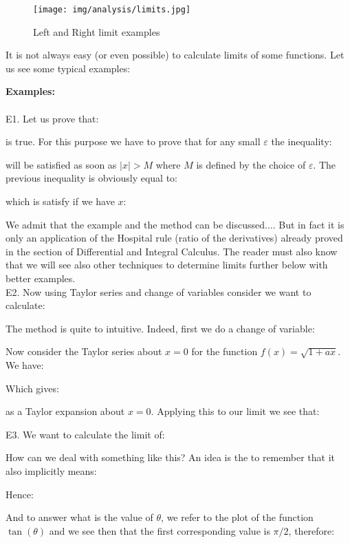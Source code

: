 	\begin{figure}[H]
		\centering
		\texttt{[image: img/analysis/limits.jpg]}
		\caption{Left and Right limit examples}
	\end{figure}
	It is not always easy (or even possible) to calculate limits of some functions. Let us see some typical examples:
	\begin{tcolorbox}[colframe=black,colback=white,sharp corners]
	\textbf{{\Large {}}Examples:}\\\\
	E1. Let us prove that:
		
	is true. For this purpose we have to prove that for any small $\varepsilon$ the inequality:
	
	will be satisfied as soon as $|x|>M$ where $M$ is defined by the choice of $\varepsilon$. The previous inequality is obviously equal to:
	
	which is satisfy if we have $x$:
	
	We admit that the example and the method can be discussed.... But in fact it is only an application of the Hospital rule (ratio of the derivatives) already proved in the section of Differential and Integral Calculus. The reader must also know that we will see also other techniques to determine limits further below with better examples.\\
	
	E2. Now using Taylor series and change of variables consider we want to calculate:
	
	The method is quite to intuitive. Indeed, first we do a change of variable:
	
	Now consider the Taylor series about $x=0$ for the function $f(x)=\sqrt{1+ax}$. We have:
	
	Which gives:
	\end{tcolorbox}
	
	\begin{tcolorbox}[colframe=black,colback=white,sharp corners]
	
	as a Taylor expansion about $x=0$. Applying this to our limit we see that:
	
	E3. We want to calculate the limit of:
	
	How can we deal with something like this? An idea is the to remember that it also implicitly means:
	
	Hence:
	
	And to answer what is the value of $\theta$, we refer to the plot of the function $\tan(\theta)$ and we see then that the first corresponding value is $\pi/2$, therefore:
	
	\end{tcolorbox}
	
